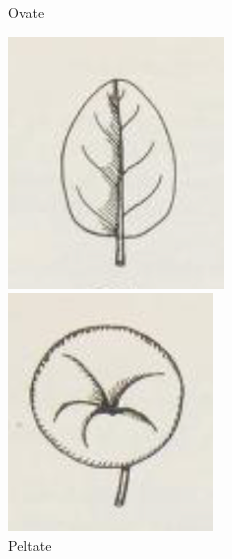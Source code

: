 \documentclass[12pt,english]{article}
\begin{document}
\begin{figure}[!hbt]
\begin{centre}
\begin{minipage}{0.19\textwidth}
	\end{minipage}
	\begin{minipage}{0.19\textwidth}
		\caption{Ovate}
		\includegraphics[width=\textwidth]{../code/contour/original/ovate}
	\end{minipage}
	\begin{minipage}{0.19\textwidth}
		\caption{Peltate}
		\includegraphics[width=\textwidth]{../code/contour/original/peltate}

\end{minipage}
\end{centre}
\end{figure}
\end{document}
